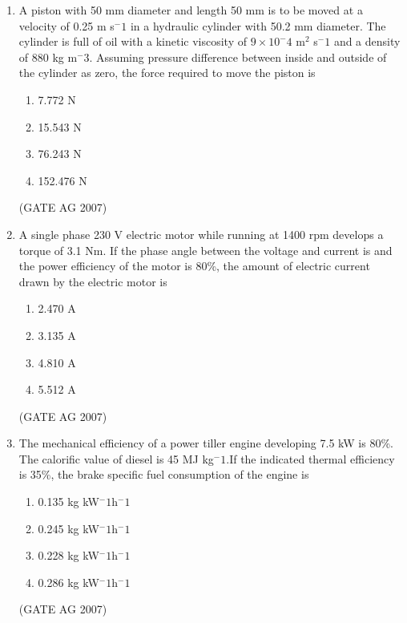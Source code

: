 \documentclass[journal,12pt,onecolumn]{IEEEtran}
\theoremstyle{remark}
\begin{document}
\begin{enumerate}
\item  A piston with 50 mm diameter and length 50 mm is to be moved at a velocity of 0.25 m s$^-1$ in a hydraulic cylinder with 50.2 mm diameter. The cylinder is full of oil with a kinetic viscosity of $9 \times 10^-4$ m$^2$ s$^-1$ and a density of 880 kg m$^-3$. Assuming pressure difference between inside and outside of the cylinder as zero, the force required to move the piston is 
\begin{multicols}{4}
\begin{enumerate}
    \item 7.772 N
    \item 15.543 N
    \item 76.243 N
    \item 152.476 N
\end{enumerate}
\end{multicols}
\hfill(GATE AG 2007)

\item  A single phase 230 V electric motor while running at 1400 rpm develops a torque of 3.1 Nm. If the phase angle between the voltage and current is            and the power efficiency of the motor is 80\%, the amount of electric current drawn by the electric motor is
\begin{multicols}{4}
 \begin{enumerate}
     \item 2.470 A
     \item 3.135 A
     \item 4.810 A
     \item 5.512 A
 \end{enumerate}   
\end{multicols}
\hfill(GATE AG 2007)

\item  The mechanical efficiency of a power tiller engine developing 7.5 kW is 80\%. The calorific value of diesel is 45 MJ kg$^-1$.If the indicated thermal efficiency is 35\%, the brake specific fuel consumption of the engine is 
\begin{multicols}{4}
    \begin{enumerate}
        \item 0.135 kg kW$^-1$h$^-1$ 
        \item 0.245  kg kW$^-1$h$^-1$ 
        \item  0.228  kg kW$^-1$h$^-1$ 
        \item 0.286  kg kW$^-1$h$^-1$ 
    \end{enumerate}
\end{multicols}
\hfill(GATE AG 2007)


\end{enumerate}
\end{document}

